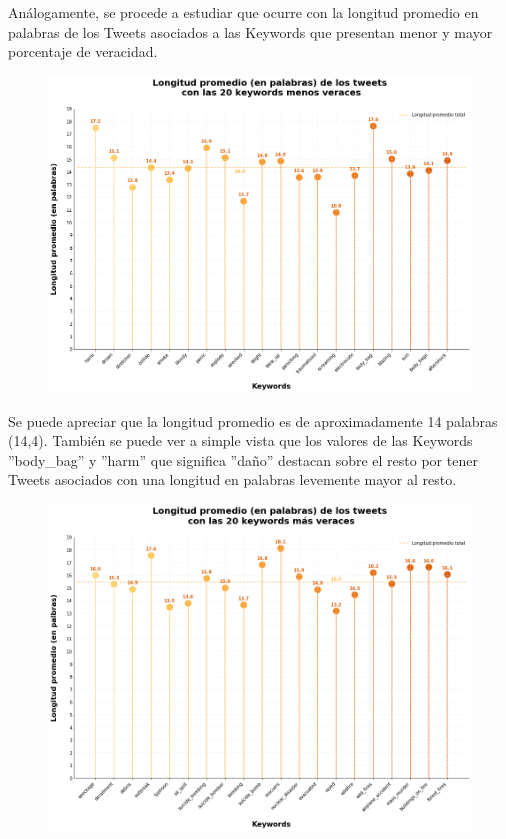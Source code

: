 \documentclass[titlepage,a4paper]{article}
\begin{document}
    \newpage
    Análogamente, se procede a estudiar que ocurre con la longitud promedio en palabras de los Tweets asociados a las Keywords que presentan menor y mayor porcentaje de veracidad.
    
    \begin{figure}[H]
    \centering
    \includegraphics[width=1\textwidth]{graficos/Analisis de Keyword/long_prom_words_keywords_no_veraces.png}
    \caption{} 
    \end{figure}
    
    Se puede apreciar que la longitud promedio es de aproximadamente 14 palabras (14,4). También se puede ver a simple vista que los valores de las Keywords ''body\_bag'' y ''harm'' que significa ''daño'' destacan sobre el resto por tener Tweets asociados con una longitud en palabras levemente mayor al resto.
     
    
    \begin{figure}[H]
    \centering
    \includegraphics[width=1\textwidth]{graficos/Analisis de Keyword/long_prom_words_keywords_veraces.png}
    \caption{} 
    \end{figure}
\end{document}
